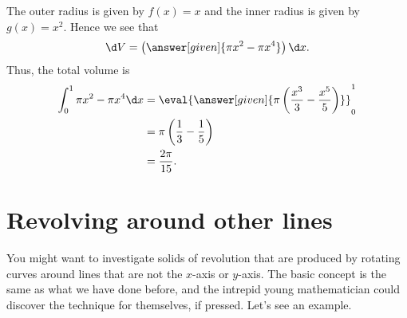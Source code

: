 \documentclass{ximera}
\begin{document}
\begin{example}
\begin{explanation}
\begin{image}
\end{image}
The outer radius is given by $f(x) = x$ and the inner radius is given
by $g(x)= x^2$. Hence we see that
\[
\d V = \left(\answer[given]{\pi x^2 - \pi x^4} \right)\d x. 
\]
Thus, the total volume is
\begin{align*}
  \int_0^1 \pi x^2-\pi x^4\d x &= \eval{\answer[given]{\pi\left(\frac{x^3}{3}-\frac{x^5}{5}\right)}}_0^1\\
  &=\pi\left(\frac{1}{3}-\frac{1}{5}\right)\\
  &=\frac{2\pi}{15}.
\end{align*}
\end{explanation}
\end{example}


\section{Revolving around other lines}

You might want to investigate solids of revolution that are produced
by rotating curves around lines that are not the $x$-axis or
$y$-axis. The basic concept is the same as what we have done before,
and the intrepid young mathematician could discover the technique for
themselves, if pressed. Let's see an example.
\end{document}
